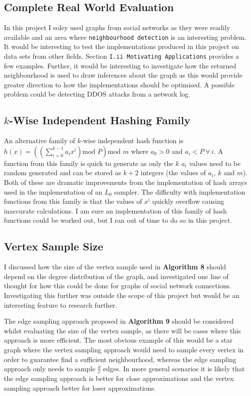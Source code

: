 \documentclass[11pt,twoside,a4paper]{report}
\begin{document}
\subsection*{Complete Real World Evaluation}
In this project I soley used graphs from social networks as they were readily available and an area where \texttt{neighbourhood detection} is an interesting problem. It would be interesting to test the implementations produced in this project on data sets from other fields. Section \texttt{I.ii Motivating Applications} provides a few examples. Further, it would be interesting to investigate how the returned neighbourhood is used to draw inferences about the graph as this would provide greater direction to how the implementations should be optimised. A possible problem could be detecting DDOS attacks from a network log.

\subsection*{$k$-Wise Independent Hashing Family}
An alternative family of $k$-wise independent hash function is ${\displaystyle h(x)=\left(\left(\sum_{i=0}^{k-1}a_ix^i\right)\text{mod }P\right)\text{mod }m}$ where $a_0>0$ and $a_i<P\ \forall\ i$. A function from this family is quick to generate as only the $k$ $a_i$ values need to be random generated and can be stored as $k+2$ integers (the values of $a_i$, $k$ and $m$). Both of these are dramatic improvements from the implementation of hash arrays used in the implementation of an $L_0$ sampler. The difficulty with implementation functions from this family is that the values of $x^i$ quickly overflow causing inaccurate calculations. I am sure an implementation of this family of hash functions could be worked out, but I ran out of time to do so in this project.

\subsection*{Vertex Sample Size}
I discussed how the size of the vertex sample used in \textbf{Algorithm 8} should depend on the degree distribution of the graph, and investigated one line of thought for how this could be done for graphs of social network connections. Investigating this further was outside the scope of this project but would be an interesting feature to research further.
\par The edge sampling approach proposed in \textbf{Algorithm 9} should be considered whilst evaluating the size of the vertex sample, as there will be cases where this approach is more efficient. The most obvious example of this would be a star graph where the vertex sampling approach would need to sample every vertex in order to guarantee find a sufficient neighbourhood, whereas the edge sampling approach only needs to sample $\frac{d}c$ edges. In more general scenarios it is likely that the edge sampling approach is better for close approximations and the vertex sampling approach better for loser approximations.
\end{document}
